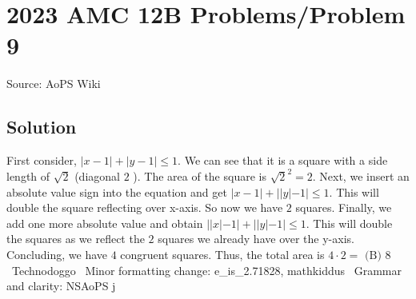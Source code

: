\documentclass[12pt]{article}
\begin{document}
\section*{{2023 AMC 12B Problems/Problem 9}}
Source: AoPS Wiki

\subsection*{Solution}
First consider, $|x-1|+|y-1| \le 1.$ We can see that it is a square with a side length of $\sqrt{2}$ (diagonal $2$ ). The area of the square is $\sqrt{2}^2 = 2.$ Next, we insert an absolute value sign into the equation and get $|x-1|+||y|-1| \le 1.$ This will double the square reflecting over x-axis. So now we have $2$ squares. Finally, we add one more absolute value and obtain $||x|-1|+||y|-1| \le 1.$ This will double the squares as we reflect the $2$ squares we already have over the y-axis. Concluding, we have $4$ congruent squares. Thus, the total area is $4\cdot2 =$ $\boxed{\text{(B) 8}}$ ~Technodoggo ~Minor formatting change: e_is_2.71828, mathkiddus ~Grammar and clarity: NSAoPS
j
\end{document}
